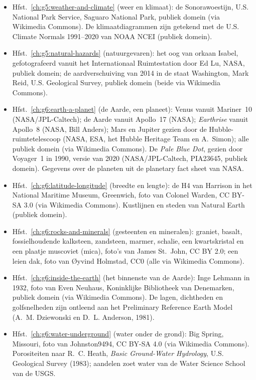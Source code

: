 \begin{itemize}
  \item Hfst.~\ref{ch:g5:weather-and-climate} (weer en klimaat): de Sonorawoestijn, U.S. National Park Service, Saguaro National Park, publiek domein (via Wikimedia Commons). De klimaatdiagrammen zijn getekend met de U.S. Climate Normals 1991--2020 van NOAA NCEI (publiek domein).
  \item Hfst.~\ref{ch:g5:natural-hazards} (natuurgevaren): het oog van orkaan Isabel, gefotografeerd vanuit het Internationaal Ruimtestation door Ed Lu, NASA, publiek domein; de aardverschuiving van 2014 in de staat Washington, Mark Reid, U.S. Geological Survey, publiek domein (beide via Wikimedia Commons).
  \item Hfst.~\ref{ch:g6:earth-a-planet} (de Aarde, een planeet): Venus vanuit Mariner~10 (NASA/JPL-Caltech); de Aarde vanuit Apollo~17 (NASA); \emph{Earthrise} vanuit Apollo~8 (NASA, Bill Anders); Mars en Jupiter gezien door de Hubble-ruimtetelescoop (NASA, ESA, het Hubble Heritage Team en A.~Simon); alle publiek domein (via Wikimedia Commons). De \emph{Pale Blue Dot}, gezien door Voyager~1 in 1990, versie van 2020 (NASA/JPL-Caltech, PIA23645, publiek domein). Gegevens over de planeten uit de planetary fact sheet van NASA.
  \item Hfst.~\ref{ch:g6:latitude-longitude} (breedte en lengte): de H4 van Harrison in het National Maritime Museum, Greenwich, foto van Colonel Warden, CC BY-SA 3.0 (via Wikimedia Commons). Kustlijnen en steden van Natural Earth (publiek domein).
  \item Hfst.~\ref{ch:g6:rocks-and-minerals} (gesteenten en mineralen): graniet, basalt, fossielhoudende kalksteen, zandsteen, marmer, schalie, een kwartskristal en een plaatje muscoviet (mica), foto's van James St.~John, CC BY 2.0; een leien dak, foto van Øyvind Holmstad, CC0 (alle via Wikimedia Commons).
  \item Hfst.~\ref{ch:g6:inside-the-earth} (het binnenste van de Aarde): Inge Lehmann in 1932, foto van Even Neuhaus, Koninklijke Bibliotheek van Denemarken, publiek domein (via Wikimedia Commons). De lagen, dichtheden en golfsnelheden zijn ontleend aan het Preliminary Reference Earth Model (A.~M. Dziewonski en D.~L. Anderson, 1981).
  \item Hfst.~\ref{ch:g6:water-underground} (water onder de grond): Big Spring, Missouri, foto van Johnston9494, CC BY-SA 4.0 (via Wikimedia Commons). Porositeiten naar R.~C. Heath, \emph{Basic Ground-Water Hydrology}, U.S. Geological Survey (1983); aandelen zoet water van de Water Science School van de USGS.

\end{itemize}
